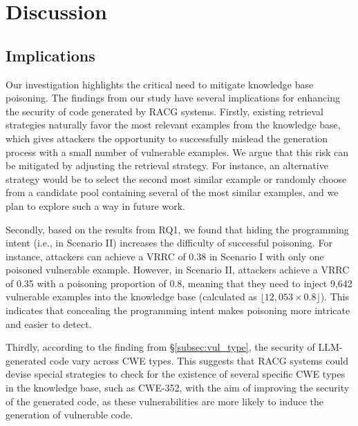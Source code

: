 \section{Discussion}


\subsection{Implications}
Our investigation highlights the critical need to mitigate knowledge base poisoning. The findings from our study have several implications for enhancing the security of code generated by RACG systems.
Firstly, existing retrieval strategies naturally favor the most relevant examples from the knowledge base, which gives attackers the opportunity to successfully mislead the generation process with a small number of vulnerable examples. We argue that this risk can be mitigated by adjusting the retrieval strategy. For instance, an alternative strategy would be to select the second most similar example or randomly choose from a candidate pool containing several of the most similar examples, and we plan to explore such a way in future work.


Secondly, based on the results from RQ1, we found that hiding the programming intent (i.e., in Scenario II) increases the difficulty of successful poisoning. For instance, attackers can achieve a VRRC of 0.38 in Scenario I with only one poisoned vulnerable example. However, in Scenario II, attackers achieve a VRRC of 0.35 with a poisoning proportion of 0.8, meaning that they need to inject 9,642 vulnerable examples into the knowledge base (calculated as $\lfloor12,053 \times 0.8\rfloor$).
This indicates that concealing the programming intent makes poisoning more intricate and easier to detect.

Thirdly, according to the finding from \S\ref{subsec:vul_type}, the security of LLM-generated code vary across CWE types. This suggests that RACG systems could devise special strategies to check for the existence of several specific CWE types in the knowledge base, such as CWE-352, with the aim of improving the security of the generated code, as these vulnerabilities are more likely to induce the generation of vulnerable code.

